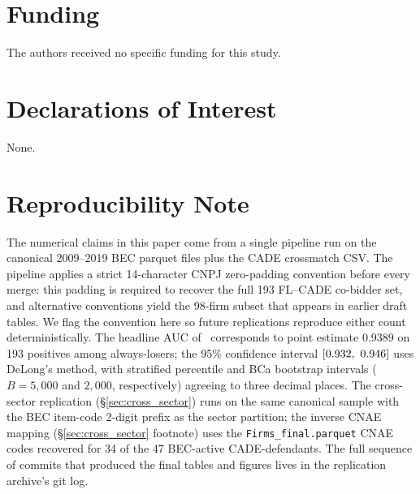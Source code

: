 \section*{Funding}

The authors received no specific funding for this study.

\section*{Declarations of Interest}

None.

\section*{Reproducibility Note}

The numerical claims in this paper come from a single pipeline
run on the canonical 2009--2019 BEC parquet files plus the CADE
crossmatch CSV. The pipeline applies a strict 14-character CNPJ
zero-padding convention before every merge: this padding is
required to recover the full 193 FL--CADE co-bidder set, and
alternative conventions yield the 98-firm subset that appears
in earlier draft tables. We flag the convention here so future
replications reproduce either count deterministically. The
headline AUC of \valAUCFLfirm\ corresponds to point estimate 0.9389 on
193 positives among \valAlwaysLosers always-losers; the 95\% confidence
interval $[0.932,\ 0.946]$ uses DeLong's method, with stratified
percentile and BCa bootstrap intervals ($B = 5,000$ and
$2,000$, respectively) agreeing to three decimal places. The
cross-sector replication (\S\ref{sec:cross_sector}) runs on the
same canonical sample with the BEC item-code 2-digit prefix as
the sector partition; the inverse CNAE mapping
(\S\ref{sec:cross_sector} footnote) uses the
\texttt{Firms\_final.parquet} CNAE codes recovered for 34 of the
47 BEC-active CADE-defendants. The full sequence of commits
that produced the final tables and figures lives in the
replication archive's git log.

